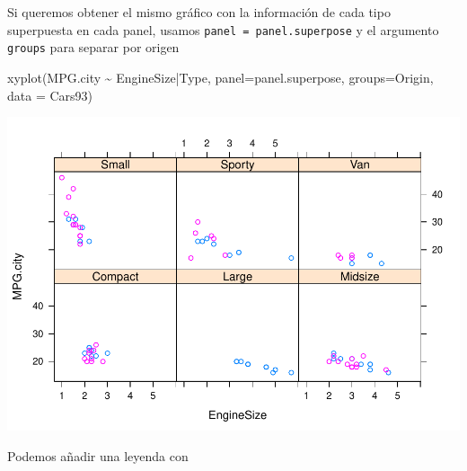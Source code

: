 \documentclass[
]{book}
\newenvironment{Shaded}{\begin{snugshade}}{\end{snugshade}}
\newcommand{\AttributeTok}[1]{\textcolor[rgb]{0.77,0.63,0.00}{#1}}
\newcommand{\CommentTok}[1]{\textcolor[rgb]{0.56,0.35,0.01}{\textit{#1}}}
\newcommand{\DecValTok}[1]{\textcolor[rgb]{0.00,0.00,0.81}{#1}}
\newcommand{\FunctionTok}[1]{\textcolor[rgb]{0.00,0.00,0.00}{#1}}
\newcommand{\NormalTok}[1]{#1}
\newcommand{\OtherTok}[1]{\textcolor[rgb]{0.56,0.35,0.01}{#1}}
\newcommand{\SpecialCharTok}[1]{\textcolor[rgb]{0.00,0.00,0.00}{#1}}
\newcommand{\StringTok}[1]{\textcolor[rgb]{0.31,0.60,0.02}{#1}}
\begin{document}
Si queremos obtener el mismo gráfico con la información de cada tipo superpuesta en cada panel, usamos \texttt{panel\ =\ panel.superpose} y el argumento \texttt{groups} para separar por origen

\begin{Shaded}
\begin{Highlighting}[]
\FunctionTok{xyplot}\NormalTok{(MPG.city }\SpecialCharTok{\textasciitilde{}}\NormalTok{ EngineSize}\SpecialCharTok{|}\NormalTok{Type,}
       \AttributeTok{panel=}\NormalTok{panel.superpose, }\AttributeTok{groups=}\NormalTok{Origin,}
       \AttributeTok{data =}\NormalTok{ Cars93)}
\end{Highlighting}
\end{Shaded}

\includegraphics{fig/unnamed-chunk-113-1.pdf}

Podemos añadir una leyenda con

\begin{Shaded}
\end{Shaded}
\end{document}
